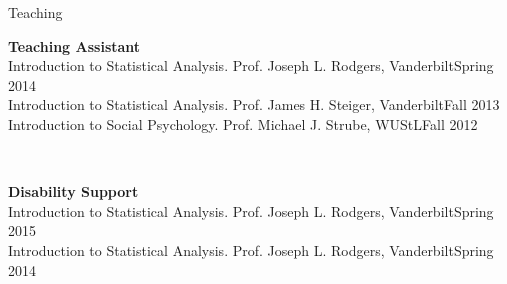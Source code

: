 \begin{rSection}{\textrm{Teaching}}
\begin{minipage}{\linewidth}{\large {\bf Teaching Assistant}}\\
Introduction to Statistical Analysis. Prof. Joseph L. Rodgers, Vanderbilt\hfill  {Spring 2014}\smallskip\\
Introduction to Statistical Analysis. Prof. James H. Steiger, Vanderbilt\hfill  {Fall 2013}\smallskip\\
Introduction to Social Psychology. Prof. Michael J. Strube, WUStL\hfill{Fall 2012}\end{minipage}\medskip\\
\begin{minipage}{\linewidth}{\large {\bf Disability Support}}\\
Introduction to Statistical Analysis. Prof. Joseph L. Rodgers, Vanderbilt\hfill  {Spring 2015}\smallskip\\
Introduction to Statistical Analysis. Prof. Joseph L. Rodgers, Vanderbilt\hfill{Spring 2014}\end{minipage}
\end{rSection}